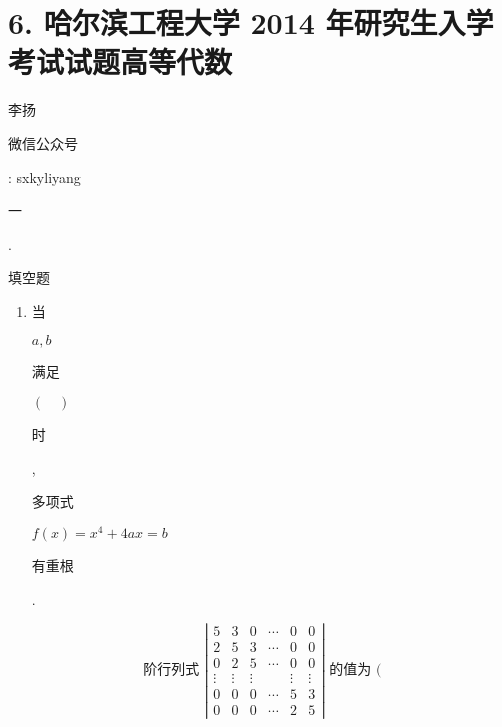 \documentclass[10pt]{article}
\begin{document}
\section{6. 哈尔滨工程大学 2014 年研究生入学考试试题高等代数}
\begin{CJK}{UTF8}{mj}李扬\end{CJK}

\begin{CJK}{UTF8}{mj}微信公众号\end{CJK}: sxkyliyang

\begin{CJK}{UTF8}{mj}一\end{CJK}. \begin{CJK}{UTF8}{mj}填空题\end{CJK}

\begin{enumerate}
  \item \begin{CJK}{UTF8}{mj}当\end{CJK} $a, b$ \begin{CJK}{UTF8}{mj}满足\end{CJK} $(\quad)$ \begin{CJK}{UTF8}{mj}时\end{CJK}, \begin{CJK}{UTF8}{mj}多项式\end{CJK} $f(x)=x^{4}+4 a x=b$ \begin{CJK}{UTF8}{mj}有重根\end{CJK}.
\end{enumerate}
$$
\text { 阶行列式 }\left|\begin{array}{cccccc}
5 & 3 & 0 & \cdots & 0 & 0 \\
2 & 5 & 3 & \cdots & 0 & 0 \\
0 & 2 & 5 & \cdots & 0 & 0 \\
\vdots & \vdots & \vdots & & \vdots & \vdots \\
0 & 0 & 0 & \cdots & 5 & 3 \\
0 & 0 & 0 & \cdots & 2 & 5
\end{array}\right| \text { 的值为 }(
$$
\end{document}
